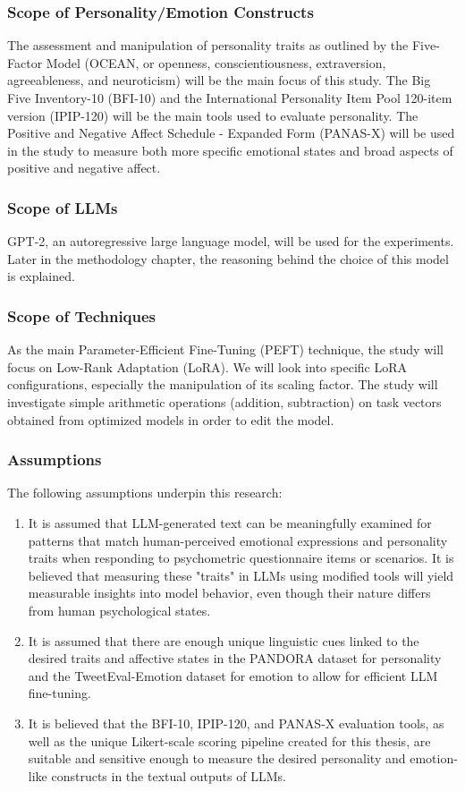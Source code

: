 \documentclass{DESSThesis}
\begin{document}
\subsubsection{Scope of Personality/Emotion Constructs}
The assessment and manipulation of personality traits as outlined by the Five-Factor Model (OCEAN, or openness, conscientiousness, extraversion, agreeableness, and neuroticism) will be the main focus of this study. The Big Five Inventory-10 (BFI-10) and the International Personality Item Pool 120-item version (IPIP-120) will be the main tools used to evaluate personality. The Positive and Negative Affect Schedule - Expanded Form (PANAS-X) will be used in the study to measure both more specific emotional states and broad aspects of positive and negative affect.

\subsubsection{Scope of LLMs}
GPT-2, an autoregressive large language model, will be used for the experiments. Later in the methodology chapter, the reasoning behind the choice of this model is explained.

\subsubsection{Scope of Techniques}
As the main Parameter-Efficient Fine-Tuning (PEFT) technique, the study will focus on Low-Rank Adaptation (LoRA). We will look into specific LoRA configurations, especially the manipulation of its scaling factor. The study will investigate simple arithmetic operations (addition, subtraction) on task vectors obtained from optimized models in order to edit the model.

\subsubsection{Assumptions}
The following assumptions underpin this research:
\begin{enumerate}
\item It is assumed that LLM-generated text can be meaningfully examined for patterns that match human-perceived emotional expressions and personality traits when responding to psychometric questionnaire items or scenarios. It is believed that measuring these "traits" in LLMs using modified tools will yield measurable insights into model behavior, even though their nature differs from human psychological states.
\item It is assumed that there are enough unique linguistic cues linked to the desired traits and affective states in the PANDORA dataset for personality and the TweetEval-Emotion dataset for emotion to allow for efficient LLM fine-tuning.
\item It is believed that the BFI-10, IPIP-120, and PANAS-X evaluation tools, as well as the unique Likert-scale scoring pipeline created for this thesis, are suitable and sensitive enough to measure the desired personality and emotion-like constructs in the textual outputs of LLMs.
\end{enumerate}
\end{document}
